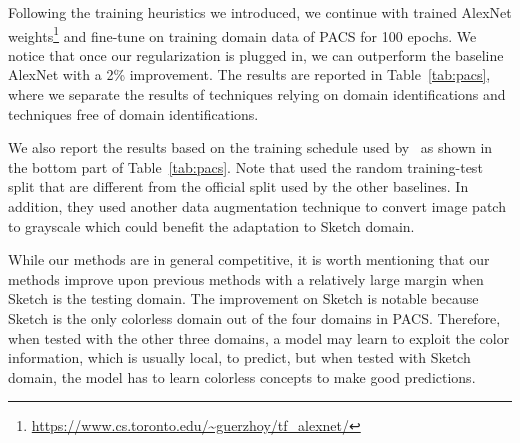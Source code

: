 \documentclass{article}
\begin{document}
Following the training heuristics we introduced, 
we continue with trained AlexNet weights\footnote{\href{https://www.cs.toronto.edu/~guerzhoy/tf_alexnet/}{https://www.cs.toronto.edu/\textasciitilde guerzhoy/tf\_alexnet/}} 
and fine-tune on training domain data of PACS for 100 epochs. 
We notice that once our regularization is plugged in, 
we can outperform the baseline AlexNet with a 2\% improvement. 
The results are reported in Table~\ref{tab:pacs}, 
where we separate the results of techniques 
relying on domain identifications and techniques free of domain identifications. 

We also report the results based on the training schedule used by~\citep{Carlucci_2019_CVPR} as shown in the bottom part of Table~\ref{tab:pacs}. Note that \citep{Carlucci_2019_CVPR} used the random training-test split that are different from the official split used by the other baselines. In addition, they used another data augmentation technique to convert image patch to grayscale which could benefit the adaptation to Sketch domain.


While our methods are in general competitive, 
it is worth mentioning that our methods improve upon previous methods 
with a relatively large margin when Sketch is the testing domain. 
The improvement on Sketch is notable 
because Sketch is the only colorless domain 
out of the four domains in PACS. 
Therefore, when tested with the other three domains, 
a model may learn to exploit the color information, 
which is usually local, to predict, but when tested with Sketch domain, 
the model has to learn colorless concepts to make good predictions. 
\end{document}
